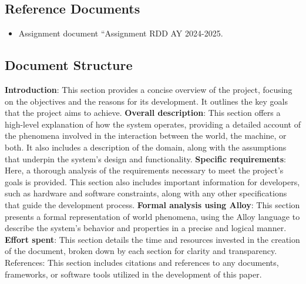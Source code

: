 \subsection{Reference Documents}
\begin{itemize}
    \item Assignment document “Assignment RDD AY 2024-2025.
\end{itemize}
\subsection{Document Structure}
\textbf{Introduction}: This section provides a concise overview of the project, focusing on the objectives and the reasons for its development. It outlines the key goals that the project aims to achieve.
\textbf{Overall description}: This section offers a high-level explanation of how the system operates, providing a detailed account of the phenomena involved in the interaction between the world, the machine, or both. It also includes a description of the domain, along with the assumptions that underpin the system’s design and functionality. \newline
\textbf{Specific requirements}: Here, a thorough analysis of the requirements necessary to meet the project’s goals is provided. This section also includes important information for developers, such as hardware and software constraints, along with any other specifications that guide the development process. \newline
\textbf{Formal analysis using Alloy}: This section presents a formal representation of world phenomena, using the Alloy language to describe the system’s behavior and properties in a precise and logical manner. \newline
\textbf{Effort spent}: This section details the time and resources invested in the creation of the document, broken down by each section for clarity and transparency.
References: This section includes citations and references to any documents, frameworks, or software tools utilized in the development of this paper.